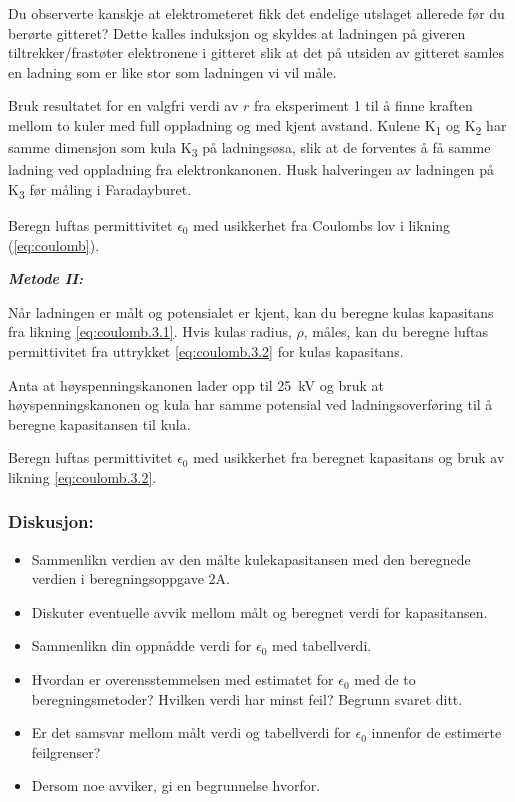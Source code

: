 \documentclass[../Elmag-labhefte-2020.tex]{subfiles}
\begin{document}
Du observerte kanskje at elektrometeret fikk det endelige utslaget allerede før du berørte gitteret? Dette kalles induksjon og skyldes at ladningen på giveren tiltrekker/frastøter elektronene i gitteret slik at det på utsiden av gitteret samles en ladning som er like stor som ladningen vi vil måle.

Bruk resultatet for en valgfri verdi av $r$ fra eksperiment 1 til å finne kraften mellom to kuler med full oppladning og med kjent avstand. Kulene K\textsubscript{1} og K\textsubscript{2} har samme dimensjon som kula K\textsubscript{3} på ladningsøsa, slik at de forventes å få samme ladning ved oppladning fra elektronkanonen. Husk halveringen av ladningen på K\textsubscript{3} før måling i Faradayburet.

{\itsf Beregn luftas permittivitet $\epsilon_0$ med usikkerhet fra Coulombs lov i likning (\ref{eq:coulomb}).}

\textbf{\emph{Metode II:}}

Når ladningen er målt og potensialet er kjent, kan du beregne kulas kapasitans fra likning \eqref{eq:coulomb.3.1}. Hvis kulas radius, $\rho$, måles, kan du beregne luftas permittivitet fra uttrykket \eqref{eq:coulomb.3.2} for kulas kapasitans.

Anta at høyspenningskanonen lader opp til \SI{25}{\kilo\volt} og bruk at høyspenningskanonen og kula har samme potensial ved ladningsoverføring til å beregne kapasitansen til kula. 

{\itsf Beregn luftas permittivitet $\epsilon_0$ med usikkerhet fra beregnet kapasitans og bruk av likning \eqref{eq:coulomb.3.2}.}

\subsubsection{Diskusjon:}
\begin{itemize}
    \item Sammenlikn verdien av den målte kulekapasitansen med den beregnede verdien i beregningsoppgave 2A.
    \item Diskuter eventuelle avvik mellom målt og beregnet verdi for kapasitansen. 
     \item Sammenlikn din oppnådde verdi for $\epsilon_0$ med tabellverdi.
    \item Hvordan er overensstemmelsen med estimatet for $\epsilon_0$ med de to beregningsmetoder? Hvilken verdi har minst feil? Begrunn svaret ditt.
    \item Er det samsvar mellom målt verdi og tabellverdi for $\epsilon_0$ innenfor de estimerte feilgrenser?
    \item Dersom noe avviker, gi en begrunnelse hvorfor.  
\end{itemize}
\end{document}
